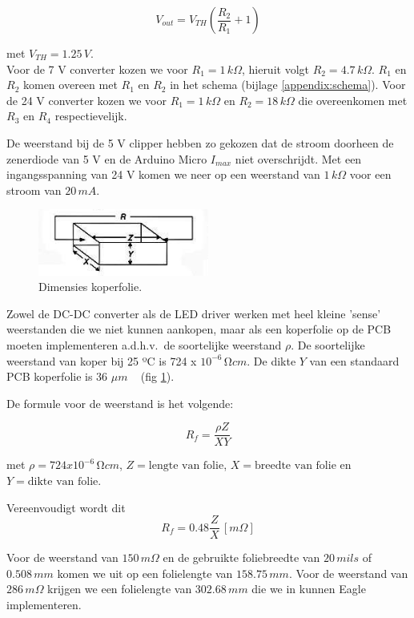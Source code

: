 \documentclass[a4paper,dutch]{article}
\begin{document}
\[V_{out} = V_{TH} (\frac{R_2}{R_1} + 1)\]

met ${V_{TH}} = 1.25 \, V$.\\

Voor de 7 V converter kozen we voor $R_1 = 1 \, k\Omega$, hieruit volgt  $R_2 = 4.7 \, k\Omega$. $R_1$ en $R_2$ komen overeen met $R_1$ en $R_2$ in het schema (bijlage \ref{appendix:schema}). Voor de 24 V converter kozen we voor $R_1 = 1 \, k\Omega$ en  $R_2 = 18 \, k\Omega$ die overeenkomen met $R_3$ en $R_4$ respectievelijk. 

De weerstand bij de 5 V clipper hebben zo gekozen dat de stroom doorheen de zenerdiode van 5 V en de Arduino Micro $I_{max}$ niet overschrijdt. Met een ingangsspanning van 24 V komen we neer op een weerstand van $1 \,k\Omega$ voor een stroom van $20 \, mA$.

\begin{figure}[H]
\centering
\includegraphics[width=0.5\textwidth]{resistance.png}
\caption{\label{fig:resistance}Dimensies koperfolie.}
\end{figure}

Zowel de DC-DC converter als de LED driver werken met heel kleine 'sense' weerstanden die we niet kunnen aankopen, maar als een koperfolie op de PCB moeten implementeren a.d.h.v.\ de soortelijke weerstand $\rho$. 
De soortelijke weerstand van koper bij 25 ºC is 724 x $10^{-6} \, Ωcm$. De dikte $Y$ van een standaard PCB koperfolie is 36 $\mu m$ ~\cite{ontwerp} (fig \ref{fig:resistance}).

De formule voor de weerstand is het volgende:

\[R_f=\frac{\rho Z}{X Y}\]

met $\rho = 724 x 10^{-6} \, Ωcm$, $Z = \text{lengte van folie}$, $X = \text{breedte van folie}$ en $Y = \text{dikte van folie}$.

Vereenvoudigt wordt dit
\[R_f=0.48 \frac{Z}{X} \, [m\Omega]\]

Voor de weerstand van $150\,m\Omega$ en de gebruikte foliebreedte van $20\,mils$ of $0.508\,mm$ komen we uit op een folielengte van $158.75\,mm$. Voor de weerstand van $286\,m\Omega$ krijgen we een folielengte van $302.68\,mm$ die we in kunnen Eagle implementeren.
\end{document}
